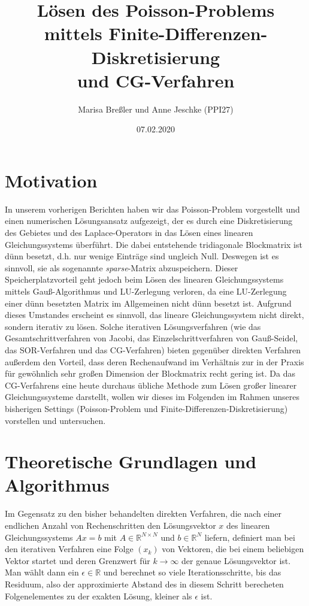 \documentclass{scrartcl}
\begin{document}
\title{Lösen des Poisson-Problems mittels Finite-Differenzen-Diskretisierung\\
und CG-Verfahren}
\author{Marisa Breßler und Anne Jeschke (PPI27)}
\date{07.02.2020}
\maketitle

\tableofcontents

\pagebreak
\section{Motivation}
In unserem vorherigen Berichten haben wir das Poisson-Problem vorgestellt und einen numerischen Lösungsansatz aufgezeigt, der es durch eine Diskretisierung des Gebietes und des Laplace-Operators in das Lösen eines linearen Gleichungssystems überführt.
Die dabei entstehende tridiagonale Blockmatrix ist dünn besetzt, d.h. nur wenige Einträge sind ungleich Null.
Deswegen ist es sinnvoll, sie als sogenannte \textit{sparse}-Matrix abzuspeichern.
Dieser Speicherplatzvorteil geht jedoch beim Lösen des linearen Gleichungssystems mittels Gauß-Algorithmus und LU-Zerlegung verloren, da eine LU-Zerlegung einer dünn besetzten Matrix im Allgemeinen nicht dünn besetzt ist.
Aufgrund dieses Umstandes erscheint es sinnvoll, das lineare Gleichungssystem nicht direkt, sondern iterativ zu lösen.
Solche iterativen Lösungsverfahren (wie das Gesamtschrittverfahren von Jacobi, das Einzelschrittverfahren von Gauß-Seidel, das SOR-Verfahren und das CG-Verfahren) bieten gegenüber direkten Verfahren außerdem den Vorteil, dass deren Rechenaufwand im Verhältnis zur in der Praxis für gewöhnlich sehr großen Dimension der Blockmatrix recht gering ist.
Da das CG-Verfahrens eine heute durchaus übliche Methode zum Lösen großer linearer Gleichungssysteme darstellt, wollen wir dieses im Folgenden im Rahmen unseres bisherigen Settings (Poisson-Problem und Finite-Differenzen-Diskretisierung) vorstellen und untersuchen.



\pagebreak
\section{Theoretische Grundlagen und Algorithmus}

Im Gegensatz zu den bisher behandelten direkten Verfahren, die nach einer endlichen Anzahl von Rechenschritten den Lösungsvektor $x$ des linearen Gleichungssystems $Ax=b$ mit $A\in\mathbb{R}^{N\times N}$ und $b\in\mathbb{R}^N$ liefern, definiert man bei den iterativen Verfahren eine Folge $(x_k)$ von Vektoren, die bei einem beliebigen Vektor startet und deren Grenzwert für $k \to \infty$ der genaue Lösungsvektor ist.
Man wählt dann ein $\epsilon\in\mathbb{R}$ und berechnet so viele Iterationsschritte, bis das Residuum, also der approximierte Abstand des in diesem Schritt berecheten Folgenelementes zu der exakten Lösung, kleiner als $\epsilon$ ist.
\end{document}
